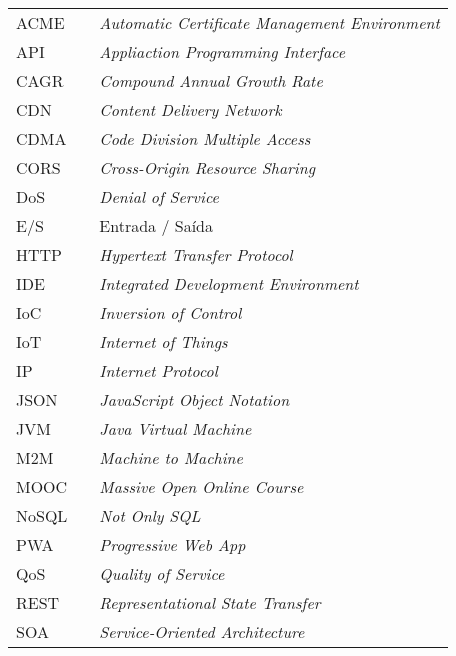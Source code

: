 \begin{table}[H]
\centering
\label{my-label}
\begin{tabular}{lll}
ACME  &  & \textit{Automatic Certificate Management Environment}     \\
API   &  & \textit{Appliaction Programming Interface}                \\
CAGR  &  & \textit{Compound Annual Growth Rate}                      \\
CDN   &  & \textit{Content Delivery Network}                         \\
CDMA  &  & \textit{Code Division Multiple Access}                    \\
CORS  &  & \textit{Cross-Origin Resource Sharing}                    \\
DoS   &  & \textit{Denial of Service}                                \\
E/S   &  & Entrada / Saída                                           \\
HTTP  &  & \textit{Hypertext Transfer Protocol}                      \\
IDE   &  & \textit{Integrated Development Environment}               \\
IoC   &  & \textit{Inversion of Control}                             \\
IoT   &  & \textit{Internet of Things}                               \\
IP    &  & \textit{Internet Protocol}                                \\
JSON  &  & \textit{JavaScript Object Notation}                       \\
JVM   &  & \textit{Java Virtual Machine}                             \\
M2M   &  & \textit{Machine to Machine}                               \\
MOOC  &  & \textit{Massive Open Online Course}                       \\
NoSQL &  & \textit{Not Only SQL}                                     \\
PWA   &  & \textit{Progressive Web App}                              \\
QoS   &  & \textit{Quality of Service}                               \\
REST  &  & \textit{Representational State Transfer}                  \\
SOA   &  & \textit{Service-Oriented Architecture}                    \\

\end{tabular}
\end{table}
